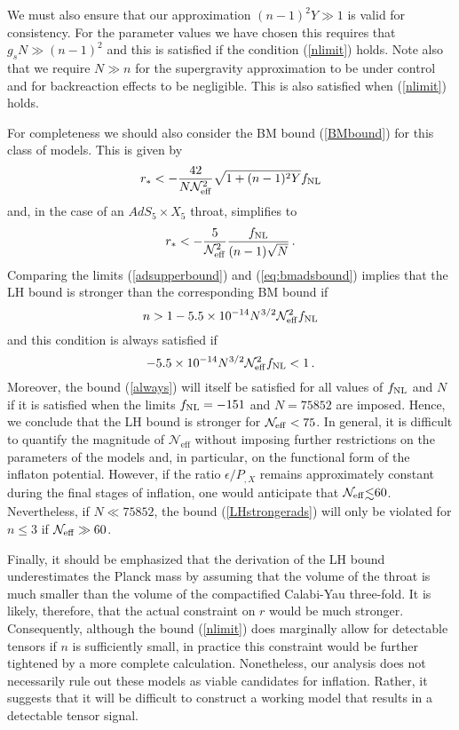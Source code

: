 {We must also ensure that our approximation $(n-1)^2Y \gg 1$ 
is valid for consistency.  
For the parameter values we have chosen this requires that 
$g_s N \gg  (n-1)^2$ 
and this is satisfied if the condition (\ref{nlimit}) 
holds. Note also that we require $N \gg n$ for the supergravity 
approximation to be under control and for backreaction effects to 
be negligible. This is also satisfied when (\ref{nlimit})  
holds. 

For completeness we should also consider the 
BM bound (\ref{BMbound}) for this class of models. This is given by 
\begin{equation}
\label{BMads}
r_* < -\frac{42}{N {\cal{N}}^2_{\rm eff}}\sqrt{1 +(n-1)^2Y}f_{\mathrm{NL}} 
\end{equation} 
and, in the case of an $AdS_5 \times X_5$ throat, simplifies to 
\begin{equation}
\label{eq:bmadsbound}
r_* < -\frac{5}{{\cal{N}}^2_{\rm eff}} 
\frac{f_{\mathrm{NL}}}{(n-1)\sqrt{N}} \,.
\end{equation} 
Comparing the limits (\ref{adsupperbound}) and (\ref{eq:bmadsbound}) 
implies that the LH bound is stronger than the corresponding BM bound if  
\begin{equation}
\label{LHstrongerads}
n > 1 -5.5 \times 10^{-14} N^{3/2} {\cal{N}}_{\rm eff}^2 f_{\mathrm{NL}} 
\end{equation}
and this condition is always satisfied if 
\begin{equation}
\label{always}
-5.5 \times 10^{-14} N^{3/2} {\cal{N}}_{\rm eff}^2 f_{\mathrm{NL}}  <1  \, .
\end{equation}
Moreover, the bound (\ref{always}) will itself be satisfied for 
all values of $f_{\mathrm{NL}}$ and $N$ if it is satisfied when the limits 
$f_{\mathrm{NL}} =-151$ and $N=75852$ are imposed. Hence, we conclude that the LH bound 
is stronger for ${\cal{N}_{\rm eff}} < 75$. 
In general, it is difficult to quantify 
the magnitude of $\mathcal{N}_{\mathrm{eff}}$ without 
imposing further restrictions on the parameters of the models 
and, in particular, on the functional form of the inflaton potential. 
However, if the ratio $\epsilon/P_{,X}$ remains approximately 
constant during the final stages of inflation, one would anticipate that 
${\cal{N}}_{\rm eff} \lsim 60$. Nevertheless, if $N \ll 75852$, the bound 
(\ref{LHstrongerads}) will only be violated for $n \le 3$ if 
${\cal{N}}_{\rm eff} \gg 60$.  

Finally, it should be emphasized that the derivation of the LH bound 
underestimates the Planck mass by assuming that 
the volume of the throat is much smaller 
than the volume of the compactified Calabi-Yau 
three-fold. It is likely, therefore, 
that the actual constraint on $r$ would be much stronger. Consequently, 
although the bound (\ref{nlimit})  
does marginally allow for detectable tensors if $n$ is sufficiently 
small, in practice this constraint would be further tightened by a more 
complete calculation. Nonetheless, our analysis does not necessarily 
rule out these models as viable candidates for inflation. Rather, it  
suggests that it will be difficult to construct a working model 
that results in a detectable tensor signal.   



}
